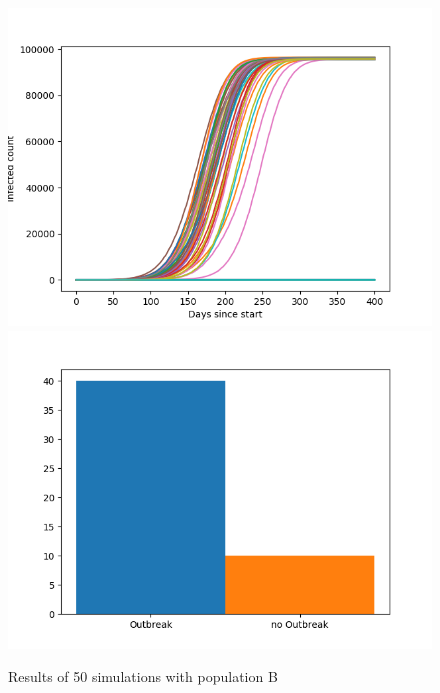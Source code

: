 \documentclass[runningheads]{llncs}
\begin{document}
\begin{figure}
	\includegraphics[width=\textwidth]{outbreaks_populationB.png}
	\includegraphics[width=\textwidth]{barchart_populationB.png}
	\caption{Results of 50 simulations with population B}
\end{figure}
\newpage
\noindent
\end{document}

